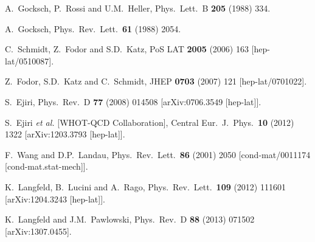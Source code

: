\documentclass[a4paper,11pt]{article}
\begin{document}
\begin{thebibliography}{12}

  A.~Gocksch, P.~Rossi and U.M.~Heller,
  Phys.\ Lett.\ B {\bf 205} (1988) 334.

  A.~Gocksch,
  Phys.\ Rev.\ Lett.\  {\bf 61} (1988) 2054.

  C.~Schmidt, Z.~Fodor and S.D.~Katz,
  PoS LAT {\bf 2005} (2006) 163
  [hep-lat/0510087].

  Z.~Fodor, S.D.~Katz and C.~Schmidt,
  JHEP {\bf 0703} (2007) 121   
  [hep-lat/0701022].

  S.~Ejiri,
  Phys.\ Rev.\ D {\bf 77} (2008) 014508
  [arXiv:0706.3549 [hep-lat]].

  S.~Ejiri {\it et al.} [WHOT-QCD Collaboration],
  Central Eur.\ J.\ Phys.\  {\bf 10} (2012) 1322
  [arXiv:1203.3793 [hep-lat]].

  F.~Wang and D.P.~Landau,
  Phys.\ Rev.\ Lett.\  {\bf 86} (2001)  2050
  [cond-mat/0011174 [cond-mat.stat-mech]].

  K.~Langfeld, B.~Lucini and A.~Rago,
  Phys.\ Rev.\ Lett.\  {\bf 109} (2012) 111601
  [arXiv:1204.3243 [hep-lat]].

  K.~Langfeld and J.M.~Pawlowski,
  Phys.\ Rev.\ D {\bf 88} (2013) 071502
  [arXiv:1307.0455].
 

\end{thebibliography}
\end{document}
